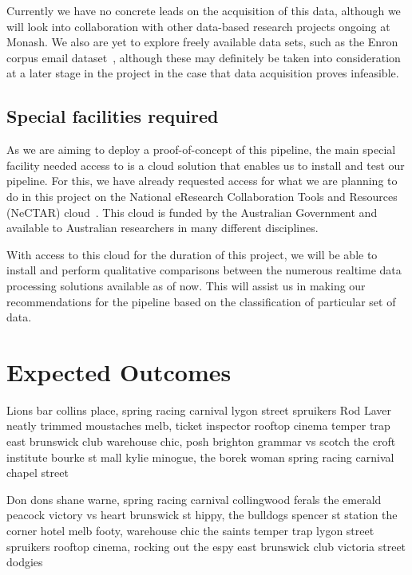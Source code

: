 \documentclass[a4paper,11pt]{article}
\begin{document}
Currently we have no concrete leads on the acquisition of this data, although we will look into collaboration with other
data-based research projects ongoing at Monash. We also are yet to explore freely available data sets, such as the Enron
corpus email dataset~\cite{klimt2004introducing}, although these may definitely be taken into
consideration at a later stage in the project in the case that data acquisition proves infeasible.


\subsection{Special facilities required} %
\label{sub:special_facilities_required}

As we are aiming to deploy a proof-of-concept of this pipeline, the main special facility needed access to is a cloud solution
that enables us to install and test our pipeline. For this, we have already requested access for what we are planning to do
in this project on the National eResearch Collaboration Tools and Resources (NeCTAR) cloud~\cite{web:Nectar}. This cloud
is funded by the Australian Government and available to Australian researchers in many different disciplines.

With
access to this cloud for the duration of this project, we will be able to install and perform qualitative comparisons
between the numerous realtime data processing solutions available as of now. This will assist us in making our recommendations
for the pipeline based on the classification of particular set of data.





\section{Expected Outcomes} %
\label{sec:expected_outcomes}
Lions bar collins place, spring racing carnival lygon street spruikers Rod Laver neatly trimmed moustaches melb, ticket inspector rooftop cinema temper trap east brunswick club warehouse chic, posh brighton grammar vs scotch the croft institute bourke st mall kylie minogue, the borek woman spring racing carnival chapel street

Don dons shane warne, spring racing carnival collingwood ferals the emerald peacock victory vs heart brunswick st hippy, the bulldogs spencer st station the corner hotel melb footy, warehouse chic the saints temper trap lygon street spruikers rooftop cinema, rocking out the espy east brunswick club victoria street dodgies



\newpage



\end{document}
